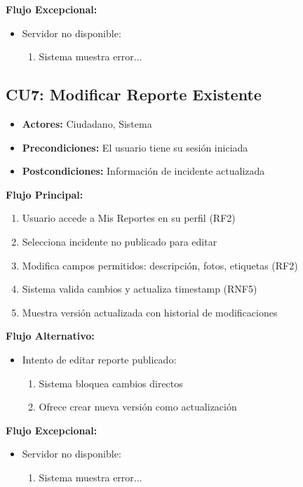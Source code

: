 \begin{multicols}{2}
\textbf{Flujo Excepcional:}
\begin{itemize}
    \item Servidor no disponible:
    \begin{enumerate}
        \item Sistema muestra error...
    \end{enumerate}
\end{itemize}

\subsection*{CU7: Modificar Reporte Existente}
\begin{itemize}
    \item \textbf{Actores:} Ciudadano, Sistema
    \item \textbf{Precondiciones:} El usuario tiene su sesión iniciada
    \item \textbf{Postcondiciones:} Información de incidente actualizada 
\end{itemize}
\textbf{Flujo Principal:}
\begin{enumerate}
    \item Usuario accede a Mis Reportes en su perfil (RF2)
    \item Selecciona incidente no publicado para editar
    \item Modifica campos permitidos: descripción, fotos, etiquetas (RF2)
    \item Sistema valida cambios y actualiza timestamp (RNF5)
    \item Muestra versión actualizada con historial de modificaciones
\end{enumerate}

\textbf{Flujo Alternativo:}
\begin{itemize}
    \item Intento de editar reporte publicado:
    \begin{enumerate}
        \item Sistema bloquea cambios directos
        \item Ofrece crear nueva versión como actualización
    \end{enumerate}
\end{itemize}

\textbf{Flujo Excepcional:}
\begin{itemize}
    \item Servidor no disponible:
    \begin{enumerate}
        \item Sistema muestra error...
    \end{enumerate}
\end{itemize}


\end{multicols}
